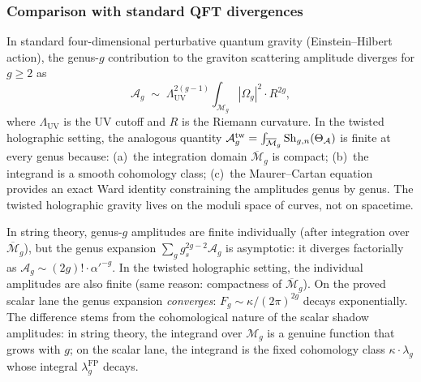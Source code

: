 \subsubsection{Comparison with standard QFT divergences}

\begin{remark}[Contrast with perturbative quantum gravity in $d = 4$]
\label{rem:thqg-I-contrast-4d}
In standard four-dimensional perturbative quantum gravity (Einstein--Hilbert action), the genus-$g$ contribution to the graviton scattering amplitude diverges for $g \geq 2$ as
\begin{equation}\label{eq:thqg-I-4d-divergence}
\mathcal{A}_g \;\sim\; \Lambda_{\mathrm{UV}}^{2(g-1)} \int_{\mathcal{M}_g} |\Omega_g|^2 \cdot R^{2g},
\end{equation}
where $\Lambda_{\mathrm{UV}}$ is the UV cutoff and $R$ is the Riemann curvature. In the twisted holographic setting, the analogous quantity $\mathcal{A}_g^{\mathrm{tw}} = \int_{\overline{\mathcal{M}}_g} \operatorname{Sh}_{g,n}(\Theta_{\mathcal{A}})$ is finite at every genus because: (a)~the integration domain $\overline{\mathcal{M}}_g$ is compact; (b)~the integrand is a smooth cohomology class; (c)~the Maurer--Cartan equation provides an exact Ward identity constraining the amplitudes genus by genus. The twisted holographic gravity lives on the moduli space of curves, not on spacetime.
\end{remark}

\begin{remark}
\label{rem:thqg-I-contrast-string}
In string theory, genus-$g$ amplitudes are finite individually (after integration over $\overline{\mathcal{M}}_g$), but the genus expansion $\sum_g g_s^{2g-2} \mathcal{A}_g$ is asymptotic: it diverges factorially as $\mathcal{A}_g \sim (2g)! \cdot \alpha'^{-g}$. In the twisted holographic setting, the individual amplitudes are also finite (same reason: compactness of $\overline{\mathcal{M}}_g$). On the proved scalar lane the genus expansion \emph{converges}: $F_g \sim \kappa/(2\pi)^{2g}$ decays exponentially. The difference stems from the cohomological nature of the scalar shadow amplitudes: in string theory, the integrand over $\mathcal{M}_g$ is a genuine function that grows with $g$; on the scalar lane, the integrand is the fixed cohomology class $\kappa \cdot \lambda_g$ whose integral $\lambda_g^{\mathrm{FP}}$ decays.
\end{remark}

